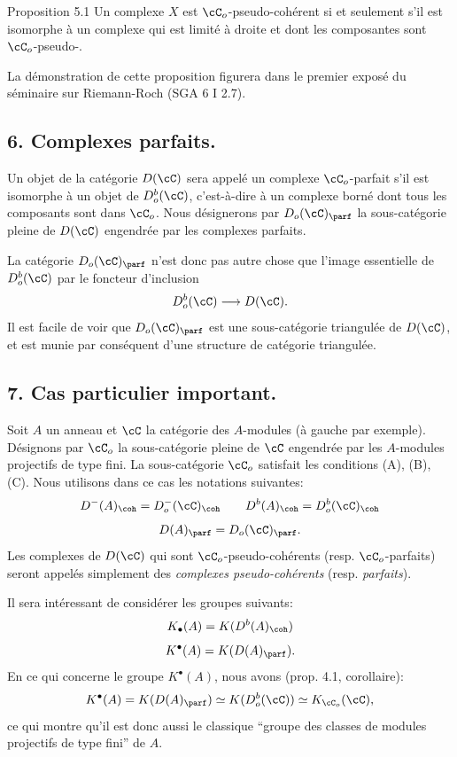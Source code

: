 \begin{statement}{Proposition 5.1}
Un complexe $X$ est $\cC_o$-pseudo-cohérent si et seulement s'il est isomorphe à un complexe qui est limité à droite et dont les composantes sont $\cC_o$-pseudo-.
\end{statement}

La démonstration de cette proposition figurera dans le premier exposé du séminaire sur Riemann-Roch (SGA 6 I 2.7).

\subsection*{6. Complexes parfaits.}

Un objet de la catégorie $D(\cC)$ sera appelé un complexe $\cC_o$-parfait s'il est isomorphe à un objet de $D_o^b(\cC)$, c'est-à-dire à un complexe borné dont tous les composants sont dans $\cC_o$. Nous désignerons par $D_o(\cC)_{\parf}$ la sous-catégorie pleine de $D(\cC)$ engendrée par les complexes parfaits.

La catégorie $D_o(\cC)_{\parf}$ n'est donc pas autre chose que l'image essentielle de $D_o^b(\cC)$ par le foncteur d'inclusion
\[
D_o^b(\cC)\longrightarrow D(\cC).
\]
Il est facile de voir que $D_o(\cC)_{\parf}$ est une sous-catégorie triangulée de $D(\cC)$, et est munie par conséquent d'une structure de catégorie triangulée.

\subsection*{7. Cas particulier important.}

Soit $A$ un anneau et $\cC$ la catégorie des $A$-modules (à gauche par exemple). Désignons par $\cC_o$ la sous-catégorie pleine de $\cC$ engendrée par les $A$-modules projectifs de type fini. La sous-catégorie $\cC_o$ satisfait les conditions (A), (B), 
(C).
Nous utilisons dans ce cas les notations suivantes:
\[
D^-(A)_{\coh}=D_o^-(\cC)_{\coh}\qquad
D^b(A)_{\coh}=D_o^b(\cC)_{\coh}
\]
\[
D(A)_{\parf}=D_o(\cC)_{\parf}.
\]
Les complexes de $D(\cC)$ qui sont $\cC_o$-pseudo-cohérents (resp. $\cC_o$-parfaits) seront appelés simplement des \emph{complexes pseudo-cohérents} (resp. \emph{parfaits}).

Il sera intéressant de considérer les groupes suivants:
\[
K_\bullet(A)=K(D^b(A)_{\coh})
\]
\[
K^\bullet(A)=K(D(A)_{\parf}).
\]
En ce qui concerne le groupe $K^\bullet(A)$, nous avons (prop. 4.1, corollaire):
\[
K^\bullet(A)=K(D(A)_{\parf})\simeq K(D_o^b(\cC))\simeq K_{\cC_o}(\cC),
\]
ce qui montre qu'il est donc aussi le classique ``groupe des classes de modules projectifs de type fini'' de $A$.

